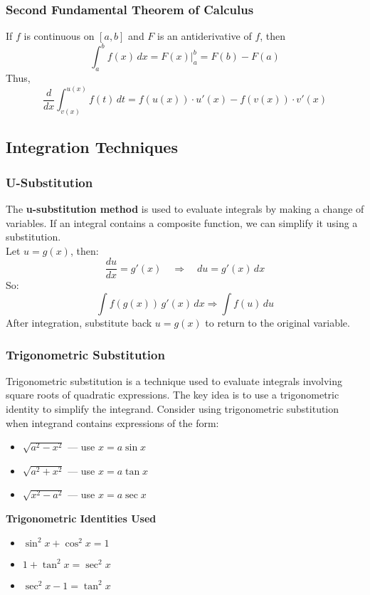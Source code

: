 \documentclass[11pt]{article}
\begin{document}
\subsubsection*{Second Fundamental Theorem of Calculus}
If $f$ is continuous on $[a,b]$ and $F$ is an antiderivative of $f$, then
\[
    \int_a^bf(x)\,dx=\left.F(x)\right|_a^b=F(b)-F(a)
\]
Thus,
\[
    \boxed{
        \frac{d}{dx}\int_{v(x)}^{u(x)}f(t)\,dt=f(u(x))\cdot u'(x) - f(v(x)) \cdot v'(x)
    }
\]
\subsection{Integration Techniques}
\subsubsection{U-Substitution}
The \textbf{u-substitution method} is used to evaluate integrals by making a change of variables. 
If an integral contains a composite function, we can simplify it using a substitution.\\
Let $u = g(x)$, then:
\[
    \frac{du}{dx} = g'(x) \quad \Rightarrow \quad du = g'(x)\,dx
\]
So:
\[
    \int f(g(x))\,g'(x)\,dx \Rightarrow\int f(u)\,du
\]After integration, 
substitute back $u = g(x)$ to return to the original variable.
\subsubsection{Trigonometric Substitution}
Trigonometric substitution is a technique used to evaluate integrals involving square roots of quadratic expressions. The key idea is to use a trigonometric identity to simplify the integrand.
Consider using trigonometric substitution when integrand contains expressions of the form:

\begin{itemize}
    \item $\sqrt{a^2 - x^2}$ — use $x = a \sin x$
    \item $\sqrt{a^2 + x^2}$ — use $x = a \tan x$
    \item $\sqrt{x^2 - a^2}$ — use $x = a \sec x$
\end{itemize}\textbf{Trigonometric Identities Used}
\begin{itemize}
    \item $\sin^2 x + \cos^2 x = 1$
    \item $1 + \tan^2 x = \sec^2 x$
    \item $\sec^2 x - 1 = \tan^2 x$
\end{itemize}
\end{document}
